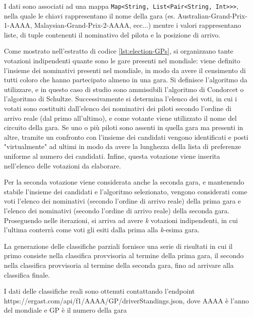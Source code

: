 \documentclass[12pt,a4paper,openright,twoside]{book}
\begin{document}
I dati sono associati ad una mappa \texttt{Map<String, List<Pair<String, Int>>>}, nella quale le chiavi rappresentano
il nome della gara (es. Australian-Grand-Prix-1-AAAA, Malaysian-Grand-Prix-2-AAAA, ecc...) mentre i valori rappresentano liste,
di tuple contenenti il nominativo del pilota e la posizione di arrivo.

Come mostrato nell'estratto di codice \ref{lst:election-GPs}, si organizzano tante votazioni indipendenti quante sono le
gare presenti nel mondiale:
viene definito l'insieme dei nominativi presenti nel mondiale, in modo da
avere il censimento di tutti coloro che hanno partecipato almeno in una gara.%
Si definisce l'algoritmo da utilizzare, e in questo caso di studio sono
ammissibili l'algoritmo di Condorcet o l'algoritmo di Schultze. 
Successivamente si determina l'elenco dei voti, in cui i votati
sono costituiti dall'elenco dei nominativi dei piloti secondo l'ordine di arrivo reale (dal primo all'ultimo), e come votante viene utilizzato il nome del circuito
della gara. Se uno o più piloti sono assenti in quella gara ma presenti in altre, tramite un confronto con l'insieme dei candidati
vengono identificati e posti "virtualmente" ad ultimi in modo da avere la lunghezza della lista 
di preferenze uniforme al numero dei candidati.
Infine, questa votazione viene inserita nell'elenco delle votazioni da elaborare.

Per la seconda votazione viene considerata anche la seconda gara, e mantenendo stabile l'insieme dei candidati e l'algoritmo selezionato,
vengono considerati come voti l'elenco dei nominativi (secondo l'ordine di arrivo reale) della prima gara
e l'elenco dei nominativi (secondo l'ordine di arrivo reale) della seconda gara.
Proseguendo nelle iterazioni, si arriva ad avere \textit{k} votazioni indipendenti, in cui l'ultima conterrà
come voti gli esiti dalla prima alla \textit{k}-esima gara.

La generazione delle classifiche parziali fornisce una serie di risultati in
cui il primo consiste nella classifica provvisoria al termine della prima gara, il secondo nella classifica provvisoria al termine 
della seconda gara, fino ad arrivare alla classifica finale.

I dati delle classifiche reali sono ottenuti contattando l'endpoint \newline https://ergast.com/api/f1/AAAA/GP/driverStandings.json,
dove AAAA è l'anno del mondiale e GP è il numero della gara
\end{document}
